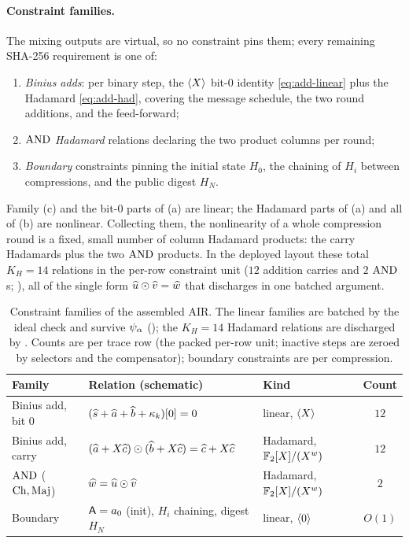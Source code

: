 \paragraph{Constraint families.} The mixing outputs are virtual, so no
constraint pins them; every remaining SHA-256 requirement is one of:
\begin{enumerate}[leftmargin=2em,label=(\alph*)]
  \item \emph{Binius adds}: per binary step, the $\langle X \rangle$ bit-$0$ identity
    \eqref{eq:add-linear} plus the Hadamard \eqref{eq:add-had}, covering the
    message schedule, the two round additions, and the feed-forward;
  \item \emph{$\operatorname{AND}$ Hadamard} relations declaring the two product columns per
    round;
  \item \emph{Boundary} constraints pinning the initial state $H_0$, the
    chaining of $H_i$ between compressions, and the public digest $H_N$.
\end{enumerate}
Family (c) and the bit-$0$ parts of (a) are linear; the Hadamard parts of (a)
and all of (b) are nonlinear. Collecting them, the nonlinearity of a whole
compression round is a fixed, small number of column Hadamard products: the
carry Hadamards plus the two $\operatorname{AND}$ products. In the deployed layout these total
$K_H = 14$ relations in the per-row constraint unit ($12$ addition carries and
$2$ $\operatorname{AND}$s; ), all of the single form
$\widehat{u}\odot\widehat{v} = \widehat{w}$ that  discharges in one batched
argument.

\begin{table}[ht]
\centering
\renewcommand{\arraystretch}{1.3}
\caption{Constraint families of the assembled AIR. The linear families are
batched by the ideal check and survive $\psi_{\alpha}$ (); the $K_H = 14$
Hadamard relations are discharged by . Counts are per trace
row (the packed per-row unit; inactive steps are zeroed by selectors and the
compensator); boundary constraints are per compression.}
\label{tab:constraints}
\begin{tabular}{@{}l l l c@{}}
\toprule
Family & Relation (schematic) & Kind & Count \\
\midrule
Binius add, bit $0$ & $(\widehat{s}+\widehat{a}+\widehat{b}+\kappa_k)[0]=0$ & linear, $\langle X \rangle$ & $12$ \\
Binius add, carry & $(\widehat{a}+X\widehat{c})\odot(\widehat{b}+X\widehat{c})=\widehat{c}+X\widehat{c}$ & Hadamard, $\mathbb{F}_2[X]/(X^{w})$ & $12$ \\
$\operatorname{AND}$ ($\operatorname{Ch},\operatorname{Maj}$) & $\widehat{w}=\widehat{u}\odot\widehat{v}$ & Hadamard, $\mathbb{F}_2[X]/(X^{w})$ & $2$ \\
Boundary & $\mathsf{A}=a_0$ (init), $H_i$ chaining, digest $H_N$ & linear, $\langle 0 \rangle$ & $O(1)$ \\
\bottomrule
\end{tabular}
\end{table}

